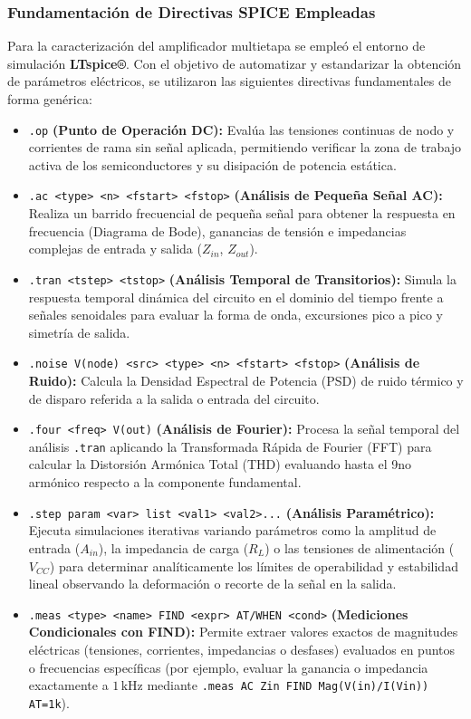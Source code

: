 
\subsubsection{Fundamentación de Directivas SPICE Empleadas}
Para la caracterización del amplificador multietapa se empleó el entorno de simulación \textbf{LTspice®}. Con el objetivo de automatizar y estandarizar la obtención de parámetros eléctricos, se utilizaron las siguientes directivas fundamentales de forma genérica:

\begin{itemize}
    \item \texttt{.op} \textbf{(Punto de Operación DC):} Evalúa las tensiones continuas de nodo y corrientes de rama sin señal aplicada, permitiendo verificar la zona de trabajo activa de los semiconductores y su disipación de potencia estática.
    \item \texttt{.ac <type> <n> <fstart> <fstop>} \textbf{(Análisis de Pequeña Señal AC):} Realiza un barrido frecuencial de pequeña señal para obtener la respuesta en frecuencia (Diagrama de Bode), ganancias de tensión e impedancias complejas de entrada y salida ($Z_{in}$, $Z_{out}$).
    \item \texttt{.tran <tstep> <tstop>} \textbf{(Análisis Temporal de Transitorios):} Simula la respuesta temporal dinámica del circuito en el dominio del tiempo frente a señales senoidales para evaluar la forma de onda, excursiones pico a pico y simetría de salida.
    \item \texttt{.noise V(node) <src> <type> <n> <fstart> <fstop>} \textbf{(Análisis de Ruido):} Calcula la Densidad Espectral de Potencia (PSD) de ruido térmico y de disparo referida a la salida o entrada del circuito.
    \item \texttt{.four <freq> V(out)} \textbf{(Análisis de Fourier):} Procesa la señal temporal del análisis \texttt{.tran} aplicando la Transformada Rápida de Fourier (FFT) para calcular la Distorsión Armónica Total (THD) evaluando hasta el 9no armónico respecto a la componente fundamental.
    \item \texttt{.step param <var> list <val1> <val2>...} \textbf{(Análisis Paramétrico):} Ejecuta simulaciones iterativas variando parámetros como la amplitud de entrada ($A_{in}$), la impedancia de carga ($R_L$) o las tensiones de alimentación ($V_{CC}$) para determinar analíticamente los límites de operabilidad y estabilidad lineal observando la deformación o recorte de la señal en la salida.
    \item \texttt{.meas <type> <name>  FIND <expr> AT/WHEN <cond>} \textbf{(Mediciones Condicionales con FIND):} Permite extraer valores exactos de magnitudes eléctricas (tensiones, corrientes, impedancias o desfases) evaluados en puntos o frecuencias específicas (por ejemplo, evaluar la ganancia o impedancia exactamente a $1\,\text{kHz}$ mediante \texttt{.meas AC Zin FIND Mag(V(in)/I(Vin)) AT=1k}).
\end{itemize}
